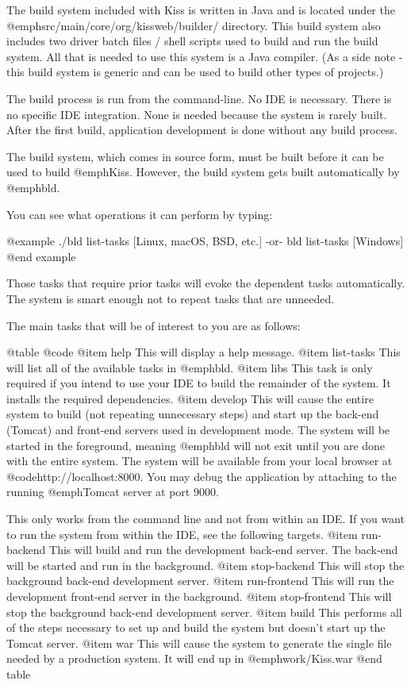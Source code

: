 The build system included with Kiss is written in Java and is located
under the @emph{src/main/core/org/kissweb/builder/} directory.  This
build system also includes two driver batch files / shell scripts used
to build and run the build system.  All that is needed to use this
system is a Java compiler.  (As a side note - this build system is
generic and can be used to build other types of projects.)

The build process is run from the command-line.  No IDE is necessary.
There is no specific IDE integration.  None is needed because the system
is rarely built.  After the first build, application development is done
without any build process.

The build system, which comes in source form, must be built before it
can be used to build @emph{Kiss}.  However, the build system gets built
automatically by @emph{bld}.

You can see what operations it can perform by typing:

@example
    ./bld list-tasks           [Linux, macOS, BSD, etc.]
        -or-
    bld list-tasks             [Windows]
@end example

Those tasks that require prior tasks will evoke the dependent tasks
automatically.  The system is smart enough not to repeat tasks that
are unneeded.

The main tasks that will be of interest to you are as follows:

@table @code
@item help
This will display a help message.
@item list-tasks
This will list all of the available tasks in @emph{bld}.
@item libs
This task is only required if you intend to use your IDE to build the
remainder of the system.  It installs the required dependencies.
@item develop
This will cause the entire system to build (not repeating unnecessary
steps) and start up the back-end (Tomcat) and front-end servers used
in development mode.  The system will be started in the foreground,
meaning @emph{bld} will not exit until you are done with the entire
system.  The system will be available from your local browser at
@code{http://localhost:8000}.  You may debug the application by
attaching to the running @emph{Tomcat} server at port 9000.

This only works from the command line and not from within an IDE.
If you want to run the system from within the IDE, see the following targets.
@item run-backend
This will build and run the development back-end server.  The back-end will
be started and run in the background.
@item stop-backend
This will stop the background back-end development server.
@item run-frontend
This will run the development front-end server in the background.
@item stop-frontend
This will stop the background back-end development server.
@item build
This performs all of the steps necessary to set up and build the system but
doesn't start up the Tomcat server.
@item war
This will cause the system to generate the single file needed by a
production system.  It will end up in @emph{work/Kiss.war}
@end table

